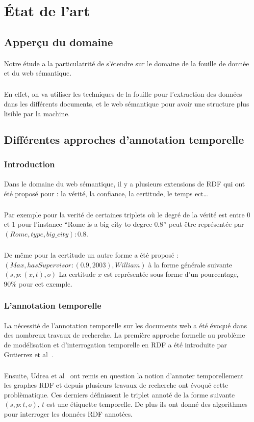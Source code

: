 \section*{État de l'art}
\subsection*{Apperçu du domaine}
\paragraph{}
Notre étude a la particulatrité de s'étendre sur le domaine de la fouille de donnée et du web sémantique.
\subparagraph{}
En effet, on va utiliser les techniques de la fouille pour l'extraction des données dans les différents documents, et le web sémantique pour avoir une structure plus lisible par la machine.
\subsection*{Différentes approches d'annotation temporelle}			
\subsubsection{Introduction}
\paragraph{}
Dans le domaine du web sémantique, il y a plusieurs extensions de RDF qui ont été proposé pour : la vérité, la confiance, la certitude, le temps ect…
\subparagraph{}
Par exemple pour la verité de certaines triplets où le degré de la vérité est entre $0$ et $1$
pour l’instance “Rome is a big city to degree 0.8” peut être représentée par $(Rome, type,big{\_}city) : 0.8$.
\subparagraph{}
De même pour la certitude un autre forme a été proposé :
$(Max,hasSupervisor : (0.9,2003),William)$ à la forme générale suivante $(s, p : (x,t),o)$
\newline 
La certitude $x$ est représentée sous forme d'un pourcentage, 90\% pour cet exemple.
\subsubsection*{L'annotation temporelle}
\paragraph{}
La nécessité de l’annotation temporelle sur les documents web a été évoqué dans des nombreux travaux de recherche. La première approche formelle au problème de modélisation et d’interrogation temporelle en RDF a été introduite par Gutierrez et al~\cite{gutierrez2005}.
\subparagraph{}
Ensuite, Udrea et al~\cite{udrea2006} ont remis en question la notion d'annoter temporellement les graphes RDF et depuis plusieurs travaux de recherche ont évoqué cette problèmatique. 
Ces derniers définissent le triplet annoté de la forme suivante $(s,p:t,o)$, $t$ est une étiquette temporelle.
De plus ils ont donné des algorithmes pour interroger les données RDF annotées.

